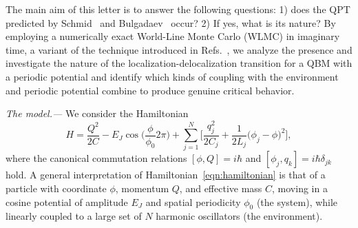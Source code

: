 \documentclass[aps,notitlepage,twocolumn,prl,nolongbibliography,superscriptaddress]{revtex4-2}
\begin{document}
The main aim of this letter is to answer the following questions: 1) does the QPT predicted by Schmid~\cite{Schmid} and Bulgadaev~\cite{Bulgadaev} occur? 2) If yes, what is its nature?
By employing a numerically exact World-Line Monte Carlo (WLMC) in imaginary time, a variant of the technique introduced in Refs.~\cite{Troyer_MC, Troyer_PRL, SuppMatRef}, we analyze the presence and investigate the nature of the localization-delocalization transition for a QBM with a periodic potential and identify which kinds of coupling with the environment and periodic potential combine to produce genuine critical behavior.

\textit{The model.---}
We consider the Hamiltonian
\begin{equation}\label{eqn:hamiltonian}
            H = \frac{Q^2}{2C} - E_J\cos\biggl(\frac{\phi}{\phi_0}2 \pi\biggr)  + \sum_{j=1}^N \biggl[ \frac{q_j^2}{2C_j} + \frac{1}{2L_j}\bigl(\phi_j -\phi\bigr)^2\biggr],
\end{equation}
where the canonical commutation relations $[\phi,Q] = i\hbar$ and $[\phi_j,q_k] = i\hbar\delta_{jk}$ hold. A general interpretation of Hamiltonian~\eqref{eqn:hamiltonian} is that of a particle with coordinate $\phi$, momentum $Q$, and effective mass $C$, moving in a cosine potential of amplitude $E_J$ and spatial periodicity $\phi_0$ (the system), while linearly coupled to a large set of $N$ harmonic oscillators (the environment).
\end{document}
